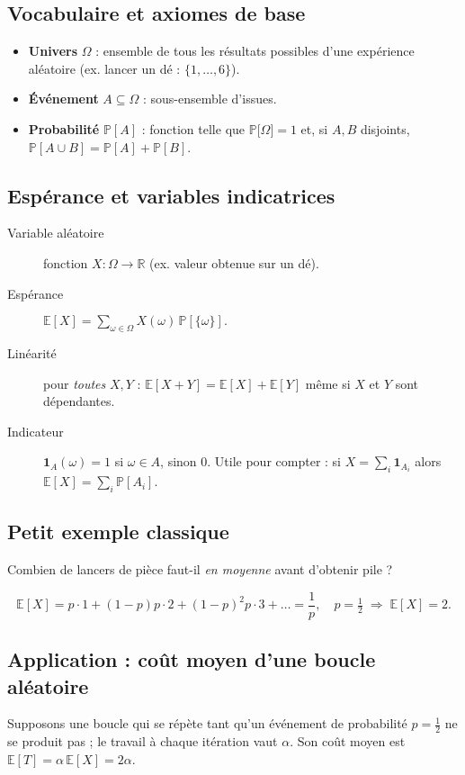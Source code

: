 \subsection{Vocabulaire et axiomes de base}
\begin{itemize}
  \item \textbf{Univers} $\Omega$ : ensemble de tous les résultats possibles
        d’une expérience aléatoire (ex. lancer un dé : $\{1,\dots,6\}$).
  \item \textbf{Événement} $A\subseteq\Omega$ : sous-ensemble d’issues.
  \item \textbf{Probabilité} \(\mathbb{P}[A]\) : fonction telle que
        \(\mathbb{P}\bigl[\Omega\bigr]=1\) et, si $A,B$ disjoints,
        \(\mathbb{P}[A\cup B]=\mathbb{P}[A]+\mathbb{P}[B]\).
\end{itemize}

\subsection{Espérance et variables indicatrices}
\begin{description}
  \item[Variable aléatoire] fonction $X:\Omega\to\mathbb{R}$ (ex. valeur
        obtenue sur un dé).
  \item[Espérance] \(\displaystyle \mathbb{E}[X]=\sum_{\omega\in\Omega}
        X(\omega)\,\mathbb{P}[\{\omega\}].\)
  \item[Linéarité] pour \emph{toutes} $X,Y$ :
        \(\mathbb{E}[X+Y]=\mathbb{E}[X]+\mathbb{E}[Y]\) même si $X$ et $Y$
        sont dépendantes.
  \item[Indicateur] \(\mathbf{1}_{A}(\omega)=1\) si $\omega\in A$, sinon 0.
        Utile pour compter : si $X=\sum_i \mathbf{1}_{A_i}$ alors
        \(\mathbb{E}[X]=\sum_i \mathbb{P}[A_i]\).
\end{description}

\subsection{Petit exemple classique}
Combien de lancers de pièce faut-il \emph{en moyenne} avant d’obtenir pile ?

\[
\mathbb{E}[X] = p\cdot1 + (1-p)p\cdot2 + (1-p)^{2}p\cdot3+\dots
              = \frac{1}{p},
\quad p=\tfrac12 \;\Rightarrow\; \mathbb{E}[X]=2.
\]

\subsection{Application : coût moyen d’une boucle aléatoire}
Supposons une boucle qui se répète tant qu’un événement de probabilité
\(p=\tfrac12\) ne se produit pas ; le travail à chaque itération vaut
\(\alpha\).  Son coût moyen est
\(\mathbb{E}[T]=\alpha\,\mathbb{E}[X]=2\alpha\).

